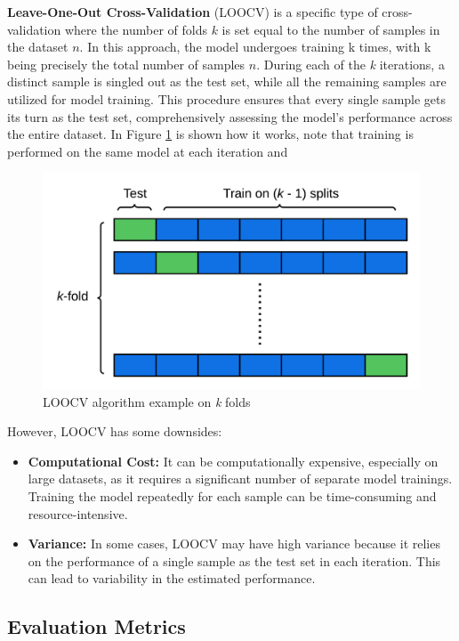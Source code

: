 \textbf{Leave-One-Out Cross-Validation} (LOOCV) is a specific type of cross-validation where the number of folds $k$ is set equal to the number of samples in the dataset $n$. 
In this approach, the model undergoes training k times, with k being precisely the total number of samples $n$.
During each of the \textit{k} iterations, a distinct sample is singled out as the test set, while all the remaining samples are utilized for model training. 
This procedure ensures that every single sample gets its turn as the test set, comprehensively assessing the model's performance across the entire dataset.
In Figure \ref{fig:LOOCV} is shown how it works, note that training is performed on the same model at each iteration and 

\begin{figure}[H]
  \centering  
    \includegraphics[width=0.8\linewidth]{graphics/LOOCV.png}
    \caption{LOOCV algorithm example on \textit{k} folds}
    \label{fig:LOOCV}
\end{figure}
However, LOOCV has some downsides:
\begin{itemize}
  \item \textbf{Computational Cost:} It can be computationally expensive, especially on large datasets, as it requires a significant number of separate model trainings. 
  Training the model repeatedly for each sample can be time-consuming and resource-intensive.
  \item \textbf{Variance:} In some cases, LOOCV may have high variance because it relies on the performance of a single sample as the test set in each iteration. 
  This can lead to variability in the estimated performance.
\end{itemize}  
    
\subsection{Evaluation Metrics}
\label{subsec:evaluation_metrics}

